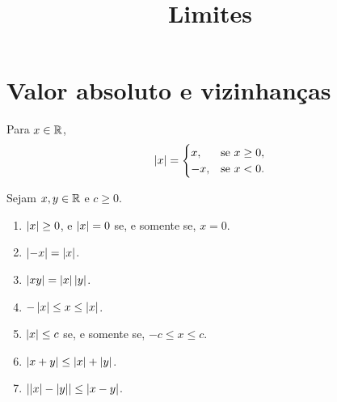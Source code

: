 \documentclass[11pt,a4paper]{article}
\title{Limites}
\author{}
\date{}
\begin{document}
\maketitle
\tableofcontents

\section{Valor absoluto e vizinhan\c{c}as}
\label{sec:abs}


\begin{definicao}
Para $x\in\mathbb{R}$,
\[
\left\lvert x \right\rvert=
\begin{cases}
x, & \text{se }x\ge 0,\\
-x, & \text{se }x<0.
\end{cases}
\]
\end{definicao}

\begin{proposicao}
\label{prop:abs}
Sejam $x,y\in\mathbb{R}$ e $c\ge 0$.
\begin{enumerate}
\item $\left\lvert x \right\rvert\ge 0$, e $\left\lvert x \right\rvert=0$ se, e somente se, $x=0$.
\item $\left\lvert -x \right\rvert=\left\lvert x \right\rvert$.
\item $\left\lvert xy \right\rvert=\left\lvert x \right\rvert\left\lvert y \right\rvert$.
\item $-\left\lvert x \right\rvert\le x\le \left\lvert x \right\rvert$.
\item $\left\lvert x \right\rvert\le c$ se, e somente se, $-c\le x\le c$.
\item $\left\lvert x+y \right\rvert\le \left\lvert x \right\rvert+\left\lvert y \right\rvert$.
\item $\left\lvert \left\lvert x \right\rvert-\left\lvert y \right\rvert \right\rvert\le \left\lvert x-y \right\rvert$.
\end{enumerate}
\end{proposicao}
\end{document}
